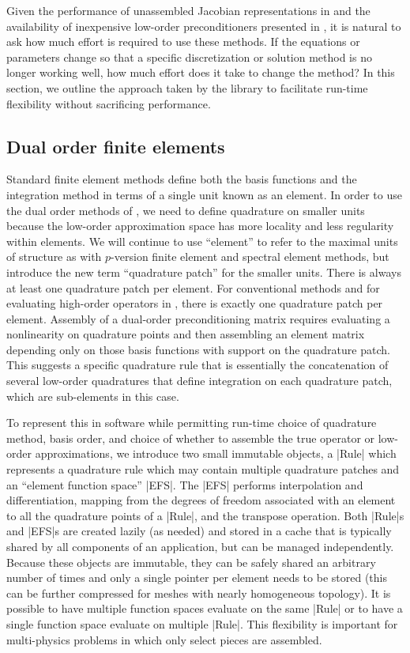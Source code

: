Given the performance of unassembled Jacobian representations in  and the availability of inexpensive low-order preconditioners presented in , it is natural to ask how much effort is required to use these methods.
If the equations or parameters change so that a specific discretization or solution method is no longer working well, how much effort does it take to change the method?
In this section, we outline the approach taken by the {\Dohp} library to facilitate run-time flexibility without sacrificing performance.

\subsection{Dual order finite elements}\label{sec:dohpuser}
Standard finite element methods define both the basis functions and the integration method in terms of a single unit known as an element.
In order to use the dual order methods of , we need to define quadrature on smaller units because the low-order approximation space has more locality and less regularity within elements.
We will continue to use ``element'' to refer to the maximal units of structure as with $p$-version finite element and spectral element methods, but introduce the new term ``quadrature patch'' for the smaller units.
There is always at least one quadrature patch per element.
For conventional methods and for evaluating high-order operators in \Dohp, there is exactly one quadrature patch per element.
Assembly of a dual-order preconditioning matrix requires evaluating a nonlinearity on quadrature points and then assembling an element matrix depending only on those basis functions with support on the quadrature patch.
This suggests a specific quadrature rule that is essentially the concatenation of several low-order quadratures that define integration on each quadrature patch, which are sub-elements in this case.

To represent this in software while permitting run-time choice of quadrature method, basis order, and choice of whether to assemble the true operator or low-order approximations, we introduce two small immutable objects, a \cverb|Rule| which represents a quadrature rule which may contain multiple quadrature patches and an ``element function space'' \cverb|EFS|.
The \cverb|EFS| performs interpolation and differentiation, mapping from the degrees of freedom associated with an element to all the quadrature points of a \cverb|Rule|, and the transpose operation.
Both \cverb|Rule|s and \cverb|EFS|s are created lazily (as needed) and stored in a cache that is typically shared by all components of an application, but can be managed independently.
Because these objects are immutable, they can be safely shared an arbitrary number of times and only a single pointer per element needs to be stored (this can be further compressed for meshes with nearly homogeneous topology).
It is possible to have multiple function spaces evaluate on the same \cverb|Rule| or to have a single function space evaluate on multiple \cverb|Rule|.
This flexibility is important for multi-physics problems in which only select pieces are assembled.

